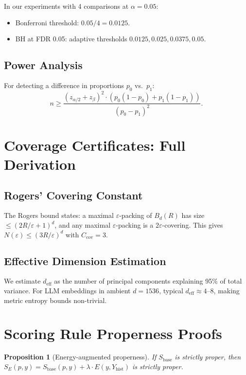 \documentclass[10pt]{article}
\newtheorem{proposition}[theorem]{Proposition}
\begin{document}
In our experiments with 4 comparisons at $\alpha = 0.05$:
\begin{itemize}
\item Bonferroni threshold: $0.05/4 = 0.0125$.
\item BH at FDR 0.05: adaptive thresholds $0.0125, 0.025, 0.0375, 0.05$.
\end{itemize}

\subsection{Power Analysis}

For detecting a difference in proportions $p_0$ vs.\ $p_1$:
\[
n \geq \frac{(z_{\alpha/2} + z_\beta)^2 \cdot (p_0(1-p_0) + p_1(1-p_1))}{(p_0 - p_1)^2}.
\]

\section{Coverage Certificates: Full Derivation}
\label{app:coverage}

\subsection{Rogers' Covering Constant}

The Rogers bound states: a maximal $\varepsilon$-packing of $B_d(R)$ has size $\leq (2R/\varepsilon + 1)^d$, and any maximal $\varepsilon$-packing is a $2\varepsilon$-covering.
This gives $N(\varepsilon) \leq (3R/\varepsilon)^d$ with $C_{\text{cov}} = 3$.

\subsection{Effective Dimension Estimation}

We estimate $d_{\text{eff}}$ as the number of principal components explaining 95\% of total variance.
For LLM embeddings in ambient $d = 1536$, typical $d_{\text{eff}} \approx 4$--$8$, making metric entropy bounds non-trivial.

\section{Scoring Rule Properness Proofs}
\label{app:properness}

\begin{proposition}[Energy-augmented properness]
\label{prop:energy-proper}
If $S_{\text{base}}$ is strictly proper, then $S_E(p, y) = S_{\text{base}}(p, y) + \lambda \cdot E(y, Y_{\text{hist}})$ is strictly proper.
\end{proposition}
\end{document}
